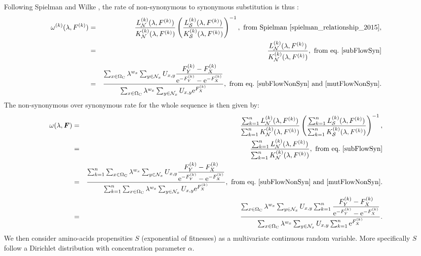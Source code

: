 \documentclass{article}
\newcommand{\e}{\mathrm{e}}
\newcommand{\SetCodon}{\Omega_{\mathrm{C}}}
\newcommand{\NonSyn}{\mathcal{N}}
\newcommand{\Syn}{\mathcal{S}}
\newcommand{\NxNonSyn}{\NonSyn_x}
\begin{document}
    Following Spielman and Wilke \cite{spielman_relationship_2015}, the rate of non-synonymous to synonymous substitution is thus :
    \begin{eqnarray}
        \omega^{(k)}(\lambda, F^{(k)})
        & = & \dfrac{L_{\NonSyn}^{(k)}(\lambda, F^{(k)})}{K_{\NonSyn}^{(k)}(\lambda, F^{(k)})}  \left( \dfrac{L_{\Syn}^{(k)}(\lambda, F^{(k)})}{K_{\Syn}^{(k)}(\lambda, F^{(k)})}  \right)^{-1}, \ \textrm{from Spielman} \ \cite{spielman_relationship_2015}, \\
        & = & \dfrac{L_{\NonSyn}^{(k)}(\lambda, F^{(k)})}{K_{\NonSyn}^{(k)}(\lambda, F^{(k)})}, \ \textrm{from eq.}\ \ref{subFlowSyn} \\
        & = & \dfrac{ \sum_{x \in \SetCodon} \lambda^{w_x} \sum_{y \in \NxNonSyn}  U_{x, y} \dfrac{F_Y^{(k)} - F_X^{(k)}}{\e^{ - F_Y^{(k)}} -  \e^{- F_X^{(k)}} } }{ \sum_{x \in \SetCodon}  \lambda^{w_x} \sum_{y \in \NxNonSyn} U_{x, y} \e^{F_X^{(k)}} }, \ \textrm{from eq.}\ \ref{subFlowNonSyn} \ \text{and} \ \ref{mutFlowNonSyn}.
        \label{omegaSite}
    \end{eqnarray}
    The non-synonymous over synonymous rate for the whole sequence is then given by:
	\begin{eqnarray}
		\omega(\lambda, \bm{F})
		& = & \dfrac{\sum_{k=1}^{n} L_{\NonSyn}^{(k)}(\lambda, F^{(k)})}{\sum_{k=1}^{n}K_{\NonSyn}^{(k)}(\lambda, F^{(k)})}  \left( \dfrac{\sum_{k=1}^{n}L_{\Syn}^{(k)}(\lambda, F^{(k)})}{\sum_{k=1}^{n}K_{\Syn}^{(k)}(\lambda, F^{(k)})}  \right)^{-1}, \\
		& = & \dfrac{\sum_{k=1}^{n} L_{\NonSyn}^{(k)}(\lambda, F^{(k)})}{\sum_{k=1}^{n}K_{\NonSyn}^{(k)}(\lambda, F^{(k)})}, \ \textrm{from eq.}\ \ref{subFlowSyn} \\
		& = & \dfrac{ \sum_{k=1}^{n} \sum_{x \in \SetCodon} \lambda^{w_x} \sum_{y \in \NxNonSyn}  U_{x, y} \dfrac{F_Y^{(k)} - F_X^{(k)}}{\e^{ - F_Y^{(k)}} -  \e^{- F_X^{(k)}} } }{ \sum_{k=1}^{n} \sum_{x \in \SetCodon}  \lambda^{w_x}  \sum_{y \in \NxNonSyn} U_{x, y} \e^{F_X^{(k)}}}, \ \textrm{from eq.}\ \ref{subFlowNonSyn} \ \text{and} \ \ref{mutFlowNonSyn}. \\
		& = & \dfrac{ \sum_{x \in \SetCodon} \lambda^{w_x} \sum_{y \in \NxNonSyn}  U_{x, y}  \sum_{k=1}^{n} \dfrac{F_Y^{(k)} - F_X^{(k)}}{\e^{ - F_Y^{(k)}} -  \e^{- F_X^{(k)}} } }{  \sum_{x \in \SetCodon}  \lambda^{w_x}  \sum_{y \in \NxNonSyn} U_{x, y}  \sum_{k=1}^{n} \e^{F_X^{(k)}}}.
		\label{omegaSeq}
	\end{eqnarray}
	    We then consider amino-acids propensities $S$ (exponential of fitnesses) as a multivariate continuous random variable. More specifically $S$ follow a Dirichlet distribution with concentration parameter $\alpha$.
\end{document}
